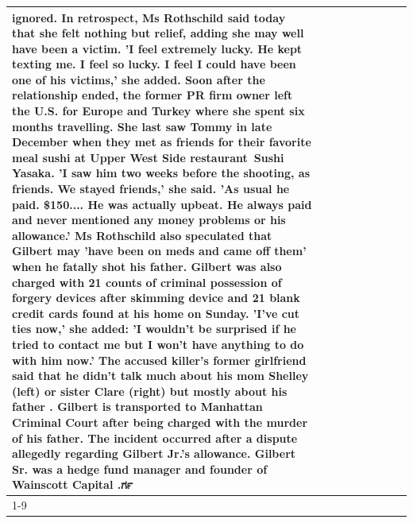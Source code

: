 \begin{table}[H]
\begin{tabular}{lllrlllll}
ignored. In retrospect, Ms Rothschild said today that she felt nothing but relief, adding she may well have been a victim. 'I feel extremely lucky. He kept texting me. I feel so lucky. I feel I could have been one of his victims,' she added. Soon after the relationship ended, the former PR firm owner left the U.S. for Europe and Turkey where she spent six months  travelling. She last saw Tommy in late December when they met as friends for their favorite meal sushi at Upper West Side restaurant Sushi Yasaka. 'I saw him two weeks before the shooting, as friends. We stayed friends,' she said. 'As usual he paid. \$150.... He was actually upbeat. He always paid and never mentioned any money problems or his allowance.' Ms Rothschild also speculated that Gilbert may 'have been on meds and came off them' when he fatally shot his father. Gilbert was also charged with 21 counts of criminal possession of forgery devices after skimming device and 21 blank credit cards found at his home on Sunday. 'I've cut ties now,' she added: 'I wouldn’t be surprised if he tried to contact me but I won’t have anything to do with him now.' The accused killer's former girlfriend said that he didn't talk much about his mom Shelley (left) or sister Clare (right) but mostly about his father . Gilbert is transported to Manhattan Criminal Court  after being charged with the murder of his father. The incident occurred after a dispute allegedly regarding Gilbert Jr.'s allowance. Gilbert Sr. was a hedge fund manager and founder of Wainscott Capital .ರ್ಗ \\
\cline{1-9}

\end{tabular}
\end{table}
